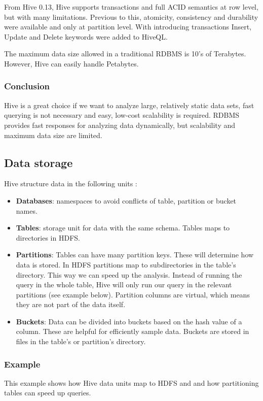 From Hive 0.13, Hive supports transactions \cite{Hive-transactions} and full ACID semantics at row level, but with many limitations. Previous to this, atomicity, consistency and durability were available and only at partition level. With introducing transactions Insert, Update and Delete keywords were added to HiveQL. 

The maximum data size allowed in a traditional RDBMS is 10's of Terabytes. However, Hive can easily handle Petabytes.

\subsubsection*{Conclusion}
Hive is a great choice if we want to analyze large, relatively static data sets, fast querying is not necessary and easy, low-cost scalability is required. RDBMS provides fast responses for analyzing data dynamically, but scalability and maximum data size are limited.

\subsection{Data storage}
Hive structure data in the following units  \cite{Hive-paper, Hive-data-units}:
\begin{itemize}
\item \textbf{Databases}: namespaces to avoid conflicts of table, partition or bucket names.
\item \textbf{Tables}: storage unit for data with the same schema. Tables maps to directories in HDFS.
\item \textbf{Partitions}: Tables can have many partition keys. These will determine how data is stored. In HDFS partitions map to subdirectories in the table's directory. This way we can speed up the analysis. Instead of running the query in the whole table, Hive will only run our query in the relevant partitions (see example below). Partition columns are virtual, which means they are not part of the data itself.
\item \textbf{Buckets}: Data can be divided into buckets based on the hash value of a column. These are helpful for efficiently sample data. Buckets are stored in files in the table's or partition's directory.
\end{itemize}

\subsubsection*{Example}
This example shows how Hive data units map to HDFS and and how partitioning tables can speed up queries.


